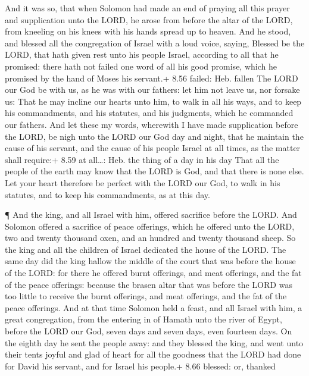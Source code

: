  And it was so, that when Solomon had made an end of
praying all this prayer and supplication unto the LORD, he arose from
before the altar of the LORD, from kneeling on his knees with his hands
spread up to heaven.  And he stood, and blessed all the
congregation of Israel with a loud voice, saying,  Blessed
be the LORD, that hath given rest unto his people Israel, according to
all that he promised: there hath not failed one word of all his good
promise, which he promised by the hand of Moses his servant.+ 8.56
failed: Heb. fallen  The LORD our God be with us, as he was
with our fathers: let him not leave us, nor forsake us: 
That he may incline our hearts unto him, to walk in all his ways, and to
keep his commandments, and his statutes, and his judgments, which he
commanded our fathers.  And let these my words, wherewith I
have made supplication before the LORD, be nigh unto the LORD our God
day and night, that he maintain the cause of his servant, and the cause
of his people Israel at all times, as the matter shall require:+ 8.59 at
all\ldots: Heb. the thing of a day in his day  That all the
people of the earth may know that the LORD is God, and that there is
none else.  Let your heart therefore be perfect with the
LORD our God, to walk in his statutes, and to keep his commandments, as
at this day.

 ¶ And the king, and all Israel with him, offered sacrifice
before the LORD.  And Solomon offered a sacrifice of peace
offerings, which he offered unto the LORD, two and twenty thousand oxen,
and an hundred and twenty thousand sheep. So the king and all the
children of Israel dedicated the house of the LORD.  The
same day did the king hallow the middle of the court that was before the
house of the LORD: for there he offered burnt offerings, and meat
offerings, and the fat of the peace offerings: because the brasen altar
that was before the LORD was too little to receive the burnt offerings,
and meat offerings, and the fat of the peace offerings. 
And at that time Solomon held a feast, and all Israel with him, a great
congregation, from the entering in of Hamath unto the river of Egypt,
before the LORD our God, seven days and seven days, even fourteen days.
 On the eighth day he sent the people away: and they
blessed the king, and went unto their tents joyful and glad of heart for
all the goodness that the LORD had done for David his servant, and for
Israel his people.+ 8.66 blessed: or, thanked

